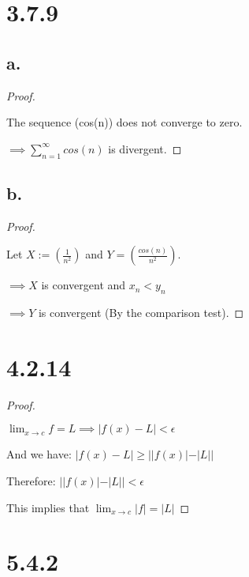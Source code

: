 \documentclass{article}
\begin{document}
\section*{3.7.9}
\subsection*{a.}
\begin{proof}
  $ $

  The sequence (cos(n)) does not converge to zero.
  
  \noindent
  $\implies \sum_{n=1}^{\infty} cos(n)$ is divergent.

\end{proof}

\subsection*{b.}
\begin{proof}
  $ $

  Let $X := (\frac{1}{n^2})$ and $Y = (\frac{cos(n)}{n^2})$. 
  
  \noindent
  $\implies X$ is convergent and $x_n < y_n$

  \noindent
  $\implies Y$ is convergent (By the comparison test).
  
\end{proof}


\section*{4.2.14}
\begin{proof}
  $ $

  $\lim_{x\to c}{f} = L \implies |f(x) - L| <   \epsilon$
  \newline

  And we have:
  $|f(x) - L| \geq ||f(x)| - |L||$
  \newline

  Therefore: 
  $||f(x)| - |L|| < \epsilon$
  \newline

  This implies that $\lim_{x\to c}{|f|} = |L|$

\end{proof}


\section*{5.4.2}
\end{document}
